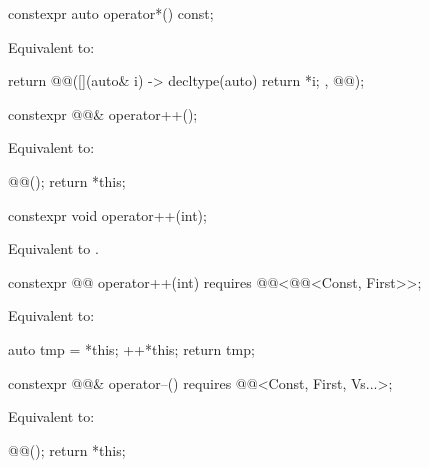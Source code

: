 \begin{itemdecl}
constexpr auto operator*() const;
\end{itemdecl}

\begin{itemdescr}
\pnum
\effects
Equivalent to:
\begin{codeblock}
return @@([](auto& i) -> decltype(auto) { return *i; }, @@);
\end{codeblock}
\end{itemdescr}

\begin{itemdecl}
constexpr @@& operator++();
\end{itemdecl}

\begin{itemdescr}
\pnum
\effects
Equivalent to:
\begin{codeblock}
@@();
return *this;
\end{codeblock}
\end{itemdescr}

\begin{itemdecl}
constexpr void operator++(int);
\end{itemdecl}

\begin{itemdescr}
\pnum
\effects
Equivalent to .
\end{itemdescr}

\begin{itemdecl}
constexpr @@ operator++(int) requires @@<@@<Const, First>>;
\end{itemdecl}

\begin{itemdescr}
\pnum
\effects
Equivalent to:
\begin{codeblock}
auto tmp = *this;
++*this;
return tmp;
\end{codeblock}
\end{itemdescr}

\begin{itemdecl}
constexpr @@& operator--()
  requires @@<Const, First, Vs...>;
\end{itemdecl}

\begin{itemdescr}
\pnum
\effects
Equivalent to:
\begin{codeblock}
@@();
return *this;
\end{codeblock}
\end{itemdescr}

